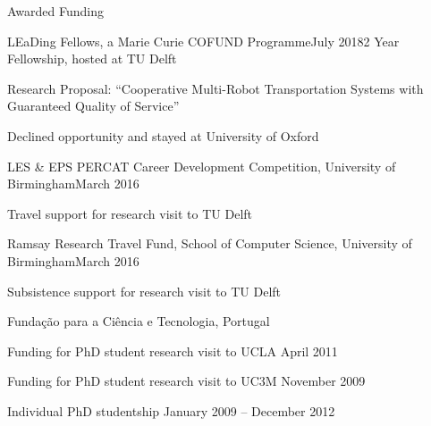 
\begin{rSection}{Awarded Funding}

\begin{rSubsection}{ LEaDing Fellows, a Marie Curie COFUND Programme}{July 2018}{2 Year Fellowship, hosted at TU Delft }{}
\item Research Proposal: ``Cooperative Multi-Robot Transportation Systems with Guaranteed Quality of Service''
\item Declined opportunity and stayed at University of Oxford
\end{rSubsection}

\begin{rSubsection}{ LES \& EPS PERCAT Career Development Competition, University of Birmingham}{March 2016}{}{}
\item Travel support for research visit to TU Delft\\
\end{rSubsection}

\begin{rSubsection}{ Ramsay Research Travel Fund, School of Computer Science, University of Birmingham}{March 2016}{}{}
\item Subsistence support for research visit to TU Delft \\
\end{rSubsection}

\begin{rSubsection}{ Funda\c{c}\~{a}o para a Ci\^{e}ncia e Tecnologia, Portugal}{}{}{}
\item Funding for PhD student research visit to UCLA \hfill April 2011\\

\item Funding for PhD student research visit to UC3M \hfill November 2009\\

\item Individual PhD studentship  \hfill  January 2009 -- December 2012\\

\end{rSubsection}

\end{rSection}
